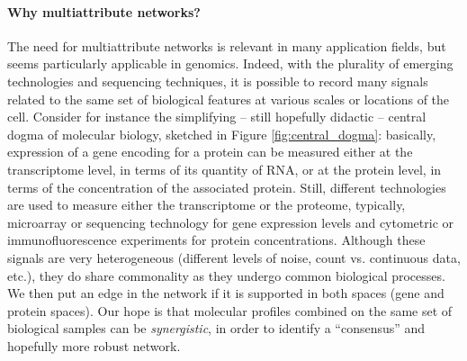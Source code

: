 \paragraph*{Why multiattribute networks?}  The need for
multiattribute networks is relevant in many application fields, but
seems particularly applicable in genomics.  Indeed, with the plurality
of emerging technologies and sequencing techniques, it is possible to
record many signals related to the same set of biological features at
various scales or locations of the cell.  Consider for instance the
simplifying -- still hopefully didactic -- central dogma of molecular
biology, sketched in Figure \ref{fig:central_dogma}: basically,
expression of a gene encoding for a protein can be measured either at
the transcriptome level, in terms of its quantity of RNA, or at the
protein level, in terms of the concentration of the associated
protein.  Still, different technologies are used to measure either the
transcriptome or the proteome, typically, microarray or sequencing
technology for gene expression levels and cytometric or
immunofluorescence experiments for protein concentrations.  Although
these signals are very heterogeneous (different levels of noise, count
vs. continuous data, etc.), they do share commonality as they undergo
common biological processes.  We then put an edge in the network if it
is supported in both spaces (gene and protein spaces).  Our hope is
that molecular profiles combined on the same set of biological samples
can be \textit{synergistic}, in order to identify a ``consensus'' and
hopefully more robust network.

